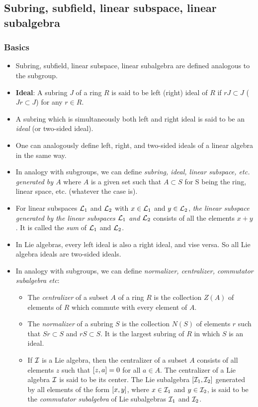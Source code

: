 \subsection{Subring, subfield, linear subspace, linear subalgebra}
\subsubsection{Basics}
\begin{itemize}
	\item Subring, subfield, linear subspace, linear subalgebra are defined analogous to the subgroup.
	\item \textbf{Ideal}: A subring $J$ of a ring $R$ is said to be left (right) ideal of $R$ if $rJ\subset J$ ($Jr\subset J$) for any $r\in R$. 
	\item A subring which is simultaneously both left and right ideal is said to be an \emph{ideal} (or two-sided ideal).
	\item One can analogously define left, right, and two-sided ideals of a linear algebra in the same way.
	\item In analogy with subgroups, we can define \emph{subring, ideal, linear subspace, etc. generated by $A$} where $A$ is a given set such that $A\subset S$ for S being the ring, linear space, etc. (whatever the case is).
	\item For linear subspaces $\mathcal{L}_1$ and $\mathcal{L}_2$ with $x\in\mathcal{L}_1$ and $y\in\mathcal{L}_2$, \emph{the linear subspace generated by the linear subspaces $\mathcal{L}_1$ and $\mathcal{L}_2$} consists of all the elements $x+y$. It is called the \emph{sum} of $\mathcal{L}_1$ and $\mathcal{L}_2$. 
	\item In Lie algebras, every left ideal is also a right ideal, and vise versa. So all Lie algebra ideals are two-sided ideals.
	\item In analogy with subgroups, we can define \emph{normalizer, centralizer, commutator subalgebra etc}:
	\begin{itemize}
		\item The \emph{centralizer} of a subset $A$ of a ring $R$ is the collection $Z(A)$ of elements of $R$ which commute with every element of $A$.
		\item The \emph{normalizer} of a subring $S$ is the collection $N(S)$ of elements $r$ such that $Sr\subset S$ and $rS\subset S$. It is the largest subring of $R$ in which $S$ is an ideal.
		\item If $\mathcal{I}$ is a Lie algebra, then the centralizer of a subset $A$ consists of all elements $z$ such that $\comm{z}{a}=0$ for all $a\in A$. The centralizer of a Lie algebra $\mathcal{I}$ is said to be its center. The Lie subalgebra $\comm{\cI_1}{\cI_2}$ generated by all elements of the form $\comm{x}{y}$, where $x\in \mathcal{I}_1$ and $y\in \mathcal{I}_2$, is said to be the \emph{commutator subalgebra} of Lie subalgebras $\mathcal{I}_1$ and $\mathcal{I}_2$.
	\end{itemize}  
\end{itemize}
